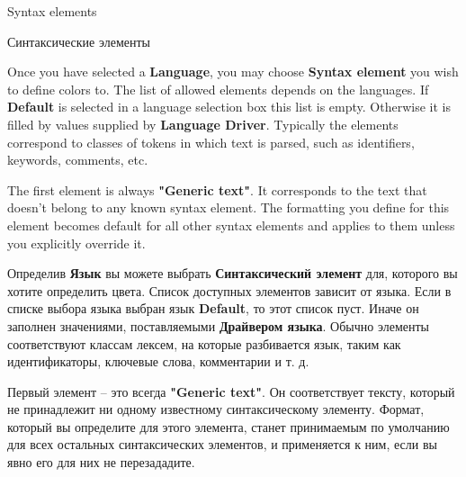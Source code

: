 \begin{popup}
\ifenglish
\caption{Syntax elements}
\else
\caption{Синтаксические элементы}
\fi
{}

\ifenglish
Once you have selected a {\bf Language}, you may choose {\bf Syntax element}
you wish to define colors to. The list of allowed elements depends on the
languages. If {\bf Default} is selected in a language selection box this
list is empty. Otherwise it is filled by values supplied by {\bf Language Driver}.
Typically the elements correspond to classes of tokens in which text is
parsed, such as identifiers, keywords, comments, etc.

The first element is always {\bf "Generic text"}. It corresponds to the text
that doesn't belong to any known syntax element. The formatting you define
for this element becomes default for all other syntax elements and applies
to them unless you explicitly override it.

\else
Определив {\bf Язык} вы можете выбрать {\bf Синтаксический элемент} для,
которого вы хотите определить цвета. Список доступных элементов зависит от
языка. Если в списке выбора языка выбран язык {\bf Default}, то этот список пуст.
Иначе он заполнен значениями, поставляемыми {\bf Драйвером языка}. Обычно элементы
соответствуют классам лексем, на которые разбивается язык, таким как
идентификаторы, ключевые слова, комментарии и т. д.

Первый элемент -- это всегда {\bf "Generic text"}. Он соответствует тексту,
который не принадлежит ни одному известному синтаксическому элементу.
Формат, который вы определите для этого элемента, станет принимаемым по
умолчанию для всех остальных синтаксических элементов, и применяется к ним,
если вы явно его для них не перезададите.
\fi
\end{popup}

